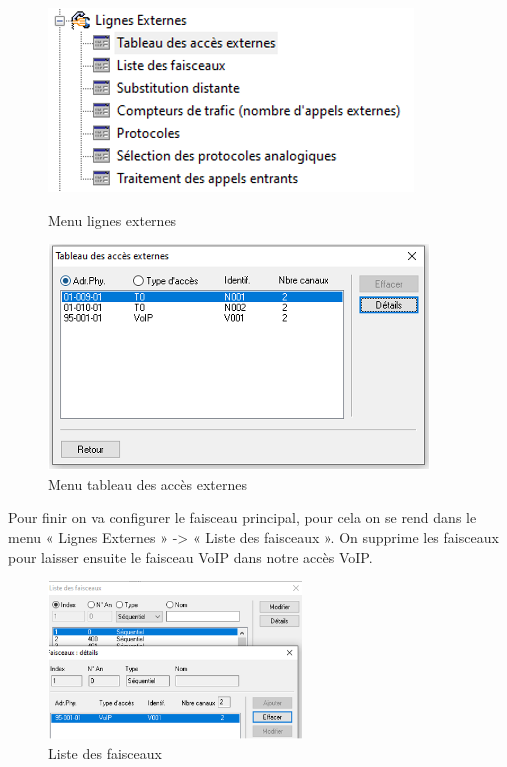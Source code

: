 \documentclass[12pt, a4paper]{article}
\begin{document}
\begin{figure}[h]
	\begin{minipage}[c]{.46\linewidth}
		\centering
		\includegraphics{img/ligne.png}
		\caption{Menu lignes externes}
	\end{minipage}
	\hfill%
	\begin{minipage}[c]{.46\linewidth}
		\centering
		\includegraphics{img/mt.png}
		\caption{Menu tableau des accès externes}
	\end{minipage}
\end{figure}

Pour finir on va configurer le faisceau principal, pour cela on se rend dans le menu
« Lignes Externes » -> « Liste des faisceaux ». On supprime les faisceaux pour laisser
ensuite le faisceau VoIP dans notre accès VoIP.

\begin{figure}[H]
	\centering
	\includegraphics[width=0.6\textwidth]{img/fs.png}
	\caption{Liste des faisceaux}
	\label{fig:fs}
\end{figure}
\end{document}
